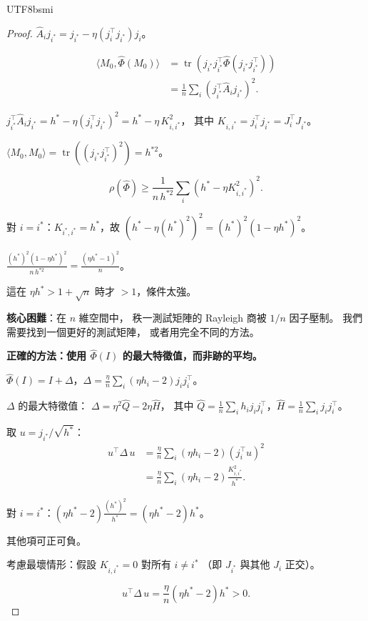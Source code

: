 \documentclass[11pt,a4paper]{article}
\theoremstyle{definition}
\DeclareMathOperator{\tr}{tr}
\begin{document}
\begin{CJK}{UTF8}{bsmi}
\begin{proof}
  $\hat{A}_i j_{i^*} = j_{i^*} - \eta(j_i^\top j_{i^*})j_i$。

  \begin{align*}
    \langle M_0, \hat\Phi(M_0)\rangle
    &= \tr(j_{i^*}j_{i^*}^\top\hat\Phi(j_{i^*}j_{i^*}^\top))\\
    &= \frac{1}{n}\sum_i (j_{i^*}^\top\hat{A}_i j_{i^*})^2.
  \end{align*}

  $j_{i^*}^\top\hat{A}_i j_{i^*} = h^* - \eta(j_i^\top j_{i^*})^2 = h^* - \eta\,K_{i,i^*}^2$，
  其中 $K_{i,i^*} = j_i^\top j_{i^*} = J_i^\top J_{i^*}$。

  $\langle M_0, M_0\rangle = \tr((j_{i^*}j_{i^*}^\top)^2) = h^{*2}$。

  \[
    \rho(\hat\Phi) \geq \frac{1}{n\,h^{*2}}\sum_i(h^* - \eta K_{i,i^*}^2)^2.
  \]

  對 $i = i^*$：$K_{i^*,i^*} = h^*$，故 $(h^* - \eta(h^*)^2)^2 = (h^*)^2(1 - \eta h^*)^2$。

  $\frac{(h^*)^2(1-\eta h^*)^2}{n\,h^{*2}} = \frac{(\eta h^* - 1)^2}{n}$。

  這在 $\eta h^* > 1 + \sqrt{n}$ 時才 $> 1$，條件太強。

  \medskip
  \textbf{核心困難}：在 $n$ 維空間中，
  秩一測試矩陣的 Rayleigh 商被 $1/n$ 因子壓制。
  我們需要找到一個更好的測試矩陣，
  或者用完全不同的方法。

  \medskip
  \textbf{正確的方法：使用 $\hat\Phi(I)$ 的最大特徵值，而非跡的平均。}

  $\hat\Phi(I) = I + \Delta$，$\Delta = \frac{\eta}{n}\sum_i(\eta h_i - 2)j_i j_i^\top$。

  $\Delta$ 的最大特徵值：
  $\Delta = \eta^2\hat{Q} - 2\eta\hat{H}$，
  其中 $\hat{Q} = \frac{1}{n}\sum_i h_i j_i j_i^\top$，$\hat{H} = \frac{1}{n}\sum_i j_i j_i^\top$。

  取 $u = j_{i^*}/\sqrt{h^*}$：
  \begin{align*}
    u^\top\Delta\,u
    &= \frac{\eta}{n}\sum_i(\eta h_i - 2)(j_i^\top u)^2\\
    &= \frac{\eta}{n}\sum_i(\eta h_i - 2)\frac{K_{i,i^*}^2}{h^*}.
  \end{align*}

  對 $i = i^*$：$(\eta h^* - 2)\frac{(h^*)^2}{h^*} = (\eta h^* - 2)h^*$。

  其他項可正可負。

  考慮最壞情形：假設 $K_{i,i^*} = 0$ 對所有 $i \neq i^*$
  （即 $J_{i^*}$ 與其他 $J_i$ 正交）。

  \[
    u^\top\Delta\,u = \frac{\eta}{n}(\eta h^* - 2)h^* > 0.
  \]


\end{proof}
\end{CJK}
\end{document}
